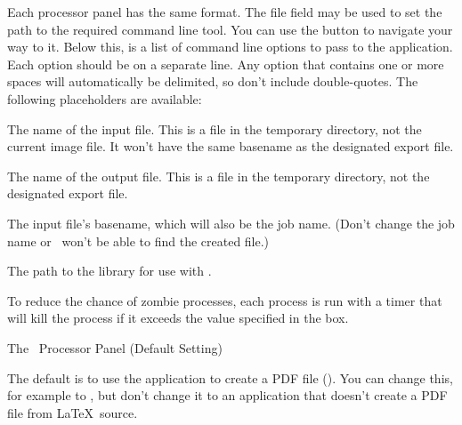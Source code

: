 Each processor panel has the same format. The file field may be used
to set the path to the required command line tool. You can use the
 button to navigate your way to it. Below this, is
a list of command line options to pass to the application. Each
option should be on a separate line. Any option that contains one or
more spaces will automatically be delimited, so don't include
double-quotes. The following placeholders are available:
\begin{deflist}

\begin{itemdesc}
The name of the input file. This is a file in the temporary
directory, not the current image file. It won't have the same
basename as the designated export file.
\end{itemdesc}


\begin{itemdesc}
The name of the output file. This is a file in the temporary
directory, not the designated export file.
\end{itemdesc}


\begin{itemdesc}
The input file's basename, which will also be the job name. (Don't change
the job name or \FlowframTk\ won't be able to find the created file.)
\end{itemdesc}


\begin{itemdesc}
The path to the  library for use with .
\end{itemdesc}

\end{deflist}


To reduce the chance of zombie processes, each process is run with a
timer that will kill the process if it exceeds the value specified
in the  box.


 {}
 {The \pdfLaTeX\ Processor Panel (Default Setting)}

The default is to use the  application to create a PDF
file (). You can change this, for
example to , but don't change it to an application that
doesn't create a PDF file from \LaTeX\ source.

